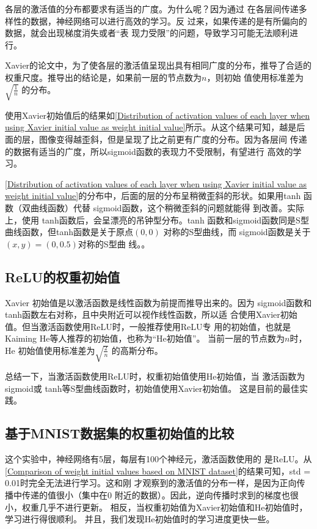 \begin{tcolorbox}
    各层的激活值的分布都要求有适当的广度。为什么呢？因为通过
    在各层间传递多样性的数据，神经网络可以进行高效的学习。反
    过来，如果传递的是有所偏向的数据，就会出现梯度消失或者“表
    现力受限”的问题，导致学习可能无法顺利进行。
\end{tcolorbox}

Xavier的论文中，为了使各层的激活值呈现出具有相同广度的分布，推导了合适的权重尺度。推导出的结论是，如果前一层的节点数为$n$，则初始
值使用标准差为$\sqrt{\frac{1}{n}}$
的分布。


使用Xavier初始值后的结果如\autoref{Distribution of activation values of each layer when using Xavier initial value as weight initial value}所示。从这个结果可知，越是后
面的层，图像变得越歪斜，但是呈现了比之前更有广度的分布。因为各层间
传递的数据有适当的广度，所以sigmoid函数的表现力不受限制，有望进行
高效的学习。

\begin{tcolorbox}
    \autoref{Distribution of activation values of each layer when using Xavier initial value as weight initial value}的分布中，后面的层的分布呈稍微歪斜的形状。如果用tanh
    函数（双曲线函数）代替 sigmoid函数，这个稍微歪斜的问题就能得
    到改善。实际上，使用 tanh函数后，会呈漂亮的吊钟型分布。tanh
    函数和sigmoid函数同是S型曲线函数，但tanh函数是关于原点$(0, 0)$
    对称的S型曲线，而 sigmoid函数是关于$(x, y)=(0, 0.5)$对称的S型曲
    线。。
\end{tcolorbox}


\subsection{ReLU的权重初始值}
Xavier 初始值是以激活函数是线性函数为前提而推导出来的。因为
sigmoid函数和 tanh函数左右对称，且中央附近可以视作线性函数，所以适
合使用Xavier初始值。但当激活函数使用ReLU时，一般推荐使用ReLU专
用的初始值，也就是Kaiming He等人推荐的初始值，也称为“He初始值”。
当前一层的节点数为$n$时，He 初始值使用标准差为$\sqrt{\frac{2}{n}}$
的高斯分布。

总结一下，当激活函数使用ReLU时，权重初始值使用He初始值，当
激活函数为 sigmoid或 tanh等S型曲线函数时，初始值使用Xavier初始值。
这是目前的最佳实践。
\subsection{基于MNIST数据集的权重初始值的比较}
这个实验中，神经网络有5层，每层有100个神经元，激活函数使用的
是ReLU。从\autoref{Comparison of weight initial values based on MNIST dataset}的结果可知，std = 0.01时完全无法进行学习。这和刚
才观察到的激活值的分布一样，是因为正向传播中传递的值很小（集中在0
附近的数据）。因此，逆向传播时求到的梯度也很小，权重几乎不进行更新。
相反，当权重初始值为Xavier初始值和He初始值时，学习进行得很顺利。
并且，我们发现He初始值时的学习进度更快一些。
